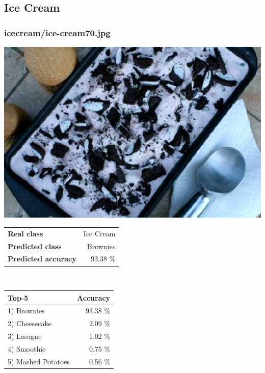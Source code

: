 \subsection{Ice Cream}
    
\subsubsection{ice\textunderscore cream/ice-cream70.jpg}

\begin{minipage}[t]{0.4\textwidth}
	\vspace{0pt}
	\includegraphics[width=\linewidth]{images/evaluation-images/ice_cream/ice-cream70.jpg}
\end{minipage}
\hfill
\begin{minipage}[t]{0.5\textwidth}
	\vspace{0pt}\raggedright
	\begin{tabularx}{\textwidth}{X r}
		\small \textbf{Real class} & \small Ice Cream\\
		\small \textbf{Predicted class} & \small Brownies\\
		\small \textbf{Predicted accuracy} & \small 93.38 \%
    \end{tabularx}\\
    
    \vspace{6pt}
	\begin{tabularx}{\textwidth}{X r}
        \small \textbf{Top-5} & \small \textbf{Accuracy} \\
        \hline
		\small 1) Brownies & \small 93.38 \%\\\small 2) Cheesecake & \small 2.09 \%\\\small 3) Lasagne & \small 1.02 \%\\\small 4) Smoothie & \small 0.75 \%\\\small 5) Mashed Potatoes & \small 0.56 \%
    \end{tabularx}
\end{minipage}
    
